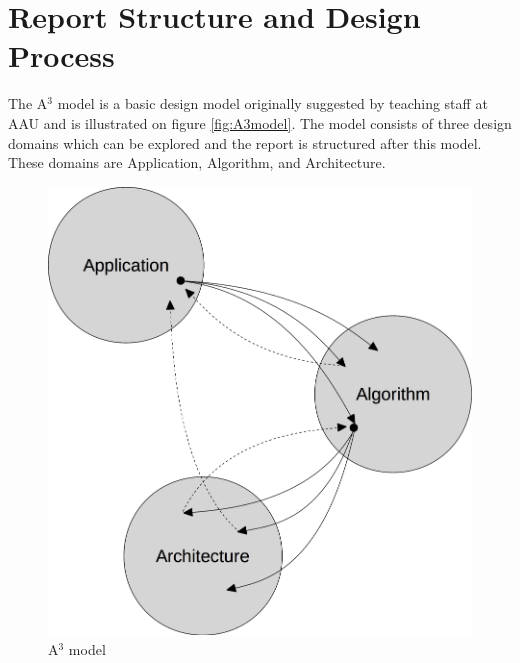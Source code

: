 \section{Report Structure and Design Process}\label{sec:a3model}
The A$^3$ model is a basic design model originally suggested by teaching staff at AAU and is illustrated on figure \vref{fig:A3model}. The model consists of three design domains which can be explored and the report is structured after this model. These domains are Application, Algorithm, and Architecture.\\
\begin{figure}[ht!]
  \centering
  \includegraphics[scale=0.25]{figures/A3model.jpg}
  \caption{A$^3$ model}
  \label{fig:A3model}
\end{figure}

